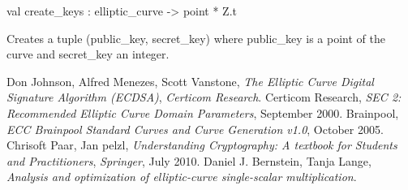 \documentclass[12pt]{article}
\begin{document}
\begin{ocamldocsigend}
\begin{ocamldocdescription}
\end{ocamldocdescription}


\label{val:Ecc.Ecc.create-underscorekeys}\begin{ocamldoccode}
val create_keys : elliptic_curve -> point * Z.t
\end{ocamldoccode}
\begin{ocamldocdescription}
Creates a tuple (public\_key, secret\_key) where public\_key is a point of
       the curve and secret\_key an integer.


\end{ocamldocdescription}
\end{ocamldocsigend}


\pagebreak

\begin{thebibliography}{2} 
 Don Johnson, Alfred Menezes, Scott Vanstone, \emph{The Elliptic Curve Digital Signature Algorithm (ECDSA)}, \emph{Certicom Research}.
 Certicom Research, \emph{SEC 2: Recommended Elliptic Curve Domain Parameters}, September 2000.
 Brainpool, \emph{ECC Brainpool Standard Curves and Curve Generation v1.0}, October 2005.
 Chrisoft Paar, Jan pelzl, \emph{Understanding Cryptography: A textbook for Students and Practitioners}, \emph{Springer}, July 2010.
 Daniel J. Bernstein, Tanja Lange, \emph{Analysis and optimization of elliptic-curve single-scalar multiplication}.
\end{thebibliography}
\end{document}
